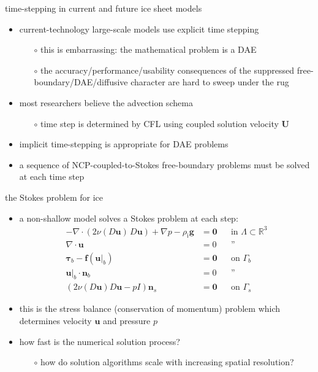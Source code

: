 \documentclass[svgnames,
               hyperref={colorlinks,citecolor=DeepPink4,linkcolor=FireBrick,urlcolor=Maroon},
               usepdftitle=false]  %
               {beamer}
\newcommand{\RR}{\mathbb{R}}
\newcommand{\bbf}{\mathbf{f}}
\newcommand{\bn}{\mathbf{n}}
\newcommand{\bu}{\mathbf{u}}
\newcommand{\bU}{\mathbf{U}}
\newcommand{\btau}{\bm{\tau}}
\newcommand{\bzero}{\bm{0}}
\newcommand{\rhoi}{\rho_{\text{i}}}
\begin{document}
\begin{frame}{time-stepping in current and future ice sheet models}

\begin{itemize}
\item current-technology large-scale models use explicit time stepping
    \begin{itemize}
    \item[$\circ$] this is embarrassing: the mathematical problem is a DAE
    \item[$\circ$] the accuracy/performance/usability consequences of the suppressed free-boundary/DAE/diffusive character are hard to sweep under the rug
    \end{itemize}
\item most researchers believe the advection schema
    \begin{itemize}
    \item[$\circ$] time step is determined by CFL using coupled solution velocity $\bU$
    \end{itemize}

\medskip
\item \alert{implicit time-stepping} is appropriate for DAE problems
\item a sequence of NCP-coupled-to-Stokes free-boundary problems must be solved at each time step
\end{itemize}
\end{frame}


\begin{frame}{the Stokes problem for ice}

\begin{itemize}
\item a non-shallow model solves a Stokes problem at each step:
\begin{align*}
- \nabla \cdot \left(2 \nu(D\bu)\, D\bu\right) + \nabla p - \rhoi \mathbf{g} &= \bzero && \text{in $\Lambda \subset \RR^3$} \\
\nabla \cdot \bu &= 0 && \text{''} \\
\btau_b - \bbf(\bu|_b) &= \bzero && \text{on $\Gamma_b$} \\
\bu|_b \cdot \bn_b &= 0 && \text{''} \\
\left(2 \nu(D\bu) D\bu - pI\right) \bn_s &= \bzero && \text{on $\Gamma_s$}
\end{align*}
\item this is the \alert{stress balance} (conservation of momentum) problem which determines velocity $\bu$ and pressure $p$
\item how fast is the numerical solution process?
    \begin{itemize}
    \item[$\circ$] how do solution algorithms \alert{scale} with increasing spatial resolution?
    \end{itemize}
\end{itemize}
\end{frame}
\end{document}
